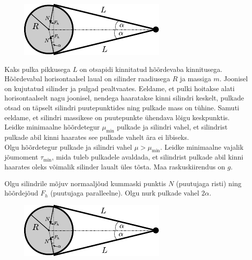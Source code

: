 \setAuthor{}

\begin{figure}
  \vspace{-8pt}
  \begin{center}
  \includegraphics[scale=0.9]{2020-v3g-07-yl.pdf}
  \end{center}
  \vspace{-25pt}
\end{figure}
Kaks pulka pikkusega $L$ on otsapidi kinnitatud hõõrdevaba kinnitusega.
Hõõrdevabal horisontaalsel laual on silinder raadiusega $R$ ja massiga $m$.
Joonisel on kujutatud silinder ja pulgad pealtvaates. Eeldame, et pulki hoitakse
alati horisontaalselt nagu joonisel, nendega haaratakse kinni silindri keskelt,
pulkade otsad on täpselt silindri puutepunktides ning pulkade mass on tühine.
Samuti eeldame, et silindri massikese on puutepunkte ühendava lõigu keskpunktis.\\
\osa Leidke minimaalne hõõrdetegur $\mu_{\min}$ pulkade ja silindri vahel,
et silindrist pulkade abil kinni haarates see pulkade vahelt ära ei libiseks.\\
\osa Olgu hõõrdetegur pulkade ja silindri vahel $\mu > \mu_{\min}$. Leidke
minimaalne vajalik jõumoment $\tau_{\min}$, mida tuleb pulkadele avaldada, et
silindrist pulkade abil kinni haarates oleks võimalik silinder laualt üles
tõsta. Maa raskuskiirendus on $g$.


\hint

\solu
\osa Olgu silindrile mõjuv normaaljõud kummaski punktis $N$ (puutujaga risti) ning hõõrdejõud $F_h$ (puutujaga paralleelne). Olgu nurk pulkade vahel $2\alpha$.

\begin{figure}[h]
\centering
\includegraphics[width=0.5\linewidth]{2020-v3g-07-yl.pdf}
\end{figure}

